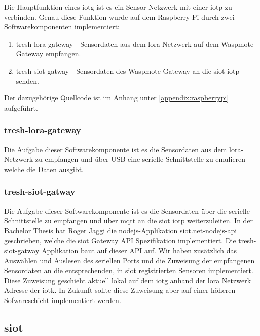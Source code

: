 Die Hauptfunktion eines \gls{iotg} ist es ein Sensor Netzwerk mit einer \gls{iotp} zu verbinden. Genau diese Funktion wurde auf dem Raspberry Pi durch zwei Softwarekomponenten implementiert:

\begin{enumerate}
	\item tresh-lora-gateway - Sensordaten aus dem \gls{lora}-Netzwerk auf dem Waspmote Gateway empfangen.
    \item tresh-siot-gatway - Sensordaten des Waspmote Gateway an die \gls{siot} \gls{iotp} senden.
\end{enumerate}

Der dazugehörige Quellcode ist im Anhang unter \ref{appendix:raspberrypi} aufgeführt.

\subsubsection*{tresh-lora-gateway}

Die Aufgabe dieser Softwarekomponente ist es die Sensordaten aus dem \gls{lora}-Netzwerk zu empfangen und über USB eine serielle Schnittstelle zu emulieren welche die Daten ausgibt.

\subsubsection*{tresh-siot-gatway}

Die Aufgabe dieser Softwarekomponente ist es die Sensordaten über die serielle Schnittstelle zu empfangen und über \gls{mqtt} an die \gls{siot} \gls{iotp} weiterzuleiten. In der Bachelor Thesis \autocite{bfh:optimizedDataTransmission} hat Roger Jaggi die \gls{nodejs}-Applikation siot.net-nodejs-api\autocite{bfh:siot.net-nodejs-api} geschrieben, welche die \gls{siot} Gateway API Spezifikation implementiert. Die tresh-siot-gatway Applikation baut auf dieser API auf. Wir haben zusätzlich das Auswählen und Auslesen des seriellen Ports und die Zuweisung der empfangenen Sensordaten an die entsprechenden, in \gls{siot} registrierten Sensoren implementiert. Diese Zuweisung geschieht aktuell lokal auf dem \gls{iotg} anhand der \gls{lora} Netzwerk Adresse der \gls{iotk}. In Zukunft sollte diese Zuweisung aber auf einer höheren Sofwareschicht implementiert werden.

\subsection{\gls{siot}}
